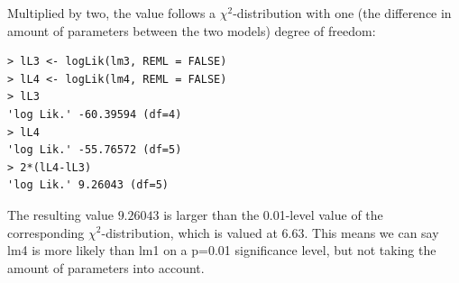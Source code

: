 \documentclass[11pt, a4paper]{article}
\begin{document}
Multiplied by two, the value follows a $\chi^2$-distribution with one
(the difference in amount of parameters between the two models) degree
of freedom:
\begin{verbatim}
> lL3 <- logLik(lm3, REML = FALSE)
> lL4 <- logLik(lm4, REML = FALSE)
> lL3
'log Lik.' -60.39594 (df=4)
> lL4
'log Lik.' -55.76572 (df=5)
> 2*(lL4-lL3)
'log Lik.' 9.26043 (df=5)
\end{verbatim}
The resulting value $9.26043$ is larger than the 0.01-level value of
the corresponding $\chi^2$-distribution, which is valued at
$6.63$. This means we can say lm4 is more likely than lm1 on a p=0.01
significance level, but not taking the amount of parameters into
account.
\end{document}
